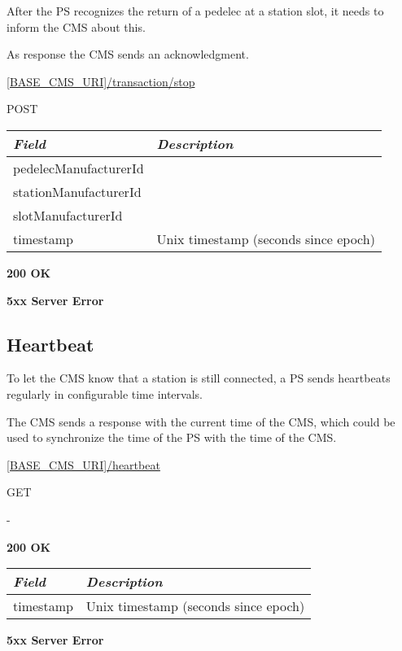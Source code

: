 After the \acs{PS} recognizes the return of a pedelec at a station slot, it needs to inform the \acs{CMS} about this.

As response the \acs{CMS} sends an acknowledgment.

 \url{[BASE_CMS_URI]/transaction/stop}

 POST

\begin{table}[!h]
\vspace{-7mm}
\begin{tabularx}{\linewidth}{ | l | X | }
  \hline
  \textit{Field} & \textit{Description} \\
  \hline \hline
  	pedelecManufacturerId			& \\
  	stationManufacturerId			& \\
  	slotManufacturerId			& \\
  	timestamp					& Unix timestamp (seconds since epoch) \\
  	
    \hline
\end{tabularx}
\end{table}

 \textbf{200 OK}

 \textbf{5xx Server Error}

\subsection{Heartbeat}

To let the \acs{CMS} know that a station is still connected, a \acs{PS} sends heartbeats regularly in configurable time intervals.

The \acs{CMS} sends a response with the current time of the \acs{CMS}, which could be used to synchronize the time of the \acs{PS} with the time of the \acs{CMS}.

 \url{[BASE_CMS_URI]/heartbeat}

 GET

 -

 \textbf{200 OK}

\begin{tabularx}{\linewidth}{ | l | X | }
  \hline
  \textit{Field} & \textit{Description} \\
  \hline \hline
  	timestamp			& Unix timestamp (seconds since epoch) \\	
  \hline
\end{tabularx}


 \textbf{5xx Server Error}
